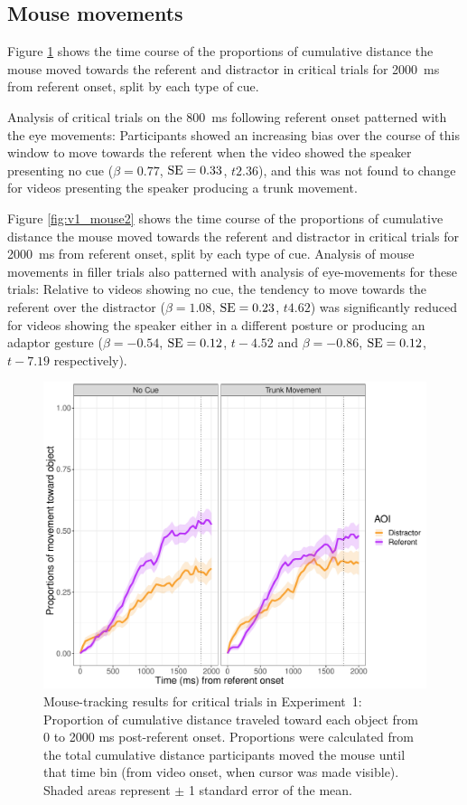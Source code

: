 \documentclass[a4paper,man,natbib]{apa6}
\newcommand{\resultsLM}[3]{$\beta = #1$, $\textnormal{SE} = #2$, $t #3$}
\begin{document}
\subsection{Mouse movements}
Figure \ref{fig:v1_mouse1} shows the time course of the proportions of cumulative distance the mouse moved towards the referent and distractor in critical trials for 2000~ms from referent onset, split by each type of cue.


Analysis of critical trials on the 800~ms following referent onset patterned with the eye movements:
Participants showed an increasing bias over the course of this window to move towards the referent when the video showed the speaker presenting no cue (\resultsLM{0.77}{0.33}{2.36}), and this was not found to change for videos presenting the speaker producing a trunk movement.

Figure \ref{fig:v1_mouse2} shows the time course of the proportions of cumulative distance the mouse moved towards the referent and distractor in critical trials for 2000~ms from referent onset, split by each type of cue.
Analysis of mouse movements in filler trials also patterned with analysis of eye-movements for these trials:
Relative to videos showing no cue, the tendency to move towards the referent over the distractor (\resultsLM{1.08}{0.23}{4.62}) was significantly reduced for videos showing the speaker either in a different posture or producing an adaptor gesture (\resultsLM{-0.54}{0.12}{-4.52} and \resultsLM{-0.86}{0.12}{-7.19} respectively).

\begin{figure}[Ht]
  \centering
	\includegraphics[width=\linewidth]{./img/e7_mouse_crit.pdf}
  \caption{Mouse-tracking results for critical trials in Experiment~1: Proportion of cumulative distance traveled toward each object from 0 to 2000 ms post-referent onset. Proportions were calculated from the total cumulative distance participants moved the mouse until that time bin (from video onset, when cursor was made visible). Shaded areas represent $\pm$ 1 standard error of the mean.}
  \label{fig:v1_mouse1}
\end{figure}
\end{document}

